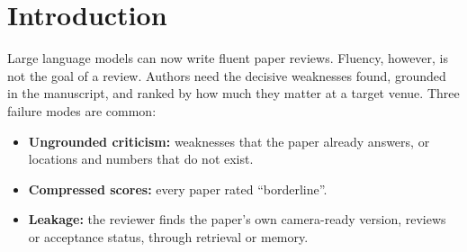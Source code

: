 \documentclass[11pt,a4paper]{article}
\begin{document}
\begin{abstract}
\begin{itemize}
same model at the same effort gives 69 papers the same rating; the skill's panel mean separates
them (13\% of paper pairs tie against 66\%; pairs ordered correctly 68\% against 62\%). On three
papers with 15 planted defects the skill finds all 15 and the plain review 12 (it misses the
numbers that must be checked across tables), and only the skill's score falls. Agreement with the
human reviewers is the same (Spearman $0.47$ and $0.45$, AUC $0.64$ and $0.63$, 48\% and 46\% of
the human main issues), but the skill states the issues more concretely: 60\% of its weakness
points name a place in the paper and 54\% say what to fix, against 26\% and 6\%. The skill costs
about ten times more.
\end{itemize}
A smaller model (Haiku) shows no reliable signal, and neither do two GPT-6.1 models run on the
same 20 papers. We also report a negative result: NMAE alone
does not measure skill on this pool, because a constant predictor scores $0.089$. The main
remaining weakness is compression: 78\% of papers receive the same final rating.
\end{abstract}

\section{Introduction}
Large language models can now write fluent paper reviews. Fluency, however, is not the goal of a
review. Authors need the decisive weaknesses found, grounded in the manuscript, and ranked by how
much they matter at a target venue. Three failure modes are common:
\begin{itemize}
\item \textbf{Ungrounded criticism:} weaknesses that the paper already answers, or locations and
numbers that do not exist.
\item \textbf{Compressed scores:} every paper rated ``borderline''.
\item \textbf{Leakage:} the reviewer finds the paper's own camera-ready version, reviews or
acceptance status, through retrieval or memory.
\end{itemize}
\end{document}
